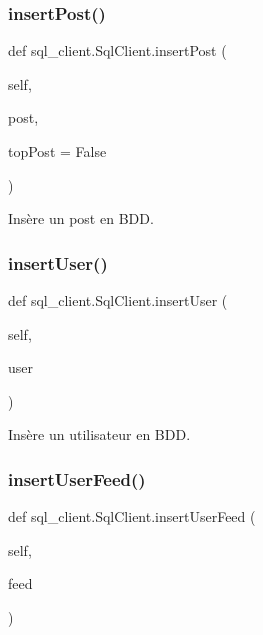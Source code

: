 \subsubsection{\texorpdfstring{insert\+Post()}{insertPost()}}
{\footnotesize\ttfamily def sql\+\_\+client.\+Sql\+Client.\+insert\+Post (\begin{DoxyParamCaption}\item[{}]{self,  }\item[{}]{post,  }\item[{}]{top\+Post = {\ttfamily False} }\end{DoxyParamCaption})}

\begin{DoxyVerb}Insère un post en BDD.
\end{DoxyVerb}
 \mbox{\label{classsql__client_1_1_sql_client_a6c838651c15d3d7484c7082dc1377be0}} 
\subsubsection{\texorpdfstring{insert\+User()}{insertUser()}}
{\footnotesize\ttfamily def sql\+\_\+client.\+Sql\+Client.\+insert\+User (\begin{DoxyParamCaption}\item[{}]{self,  }\item[{}]{user }\end{DoxyParamCaption})}

\begin{DoxyVerb}Insère un utilisateur en BDD.
\end{DoxyVerb}
 \mbox{\label{classsql__client_1_1_sql_client_a18816b3e7e51cc678cec67b3b85ebb5d}} 
\subsubsection{\texorpdfstring{insert\+User\+Feed()}{insertUserFeed()}}
{\footnotesize\ttfamily def sql\+\_\+client.\+Sql\+Client.\+insert\+User\+Feed (\begin{DoxyParamCaption}\item[{}]{self,  }\item[{}]{feed }\end{DoxyParamCaption})}

